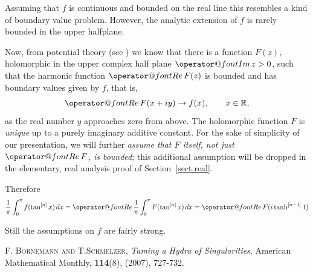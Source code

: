 \documentclass{amsart}
\makeatletter
\theoremstyle{plain}
\numberwithin{equation}{section}
\newcommand{\R}{{\mathbb  R}}
\renewcommand{\Re}{{\operator@font Re\,}}
\renewcommand{\Im}{{\operator@font Im\,}}
\makeatother
\begin{document}
Assuming that $f$ is continuous and bounded on the real line this resembles a kind of boundary value problem. However, the analytic extension of $f$ is rarely bounded in the upper halfplane.

Now, from potential theory (see \cite[Thms. 15.1a, 15.4d]{Hen}) we know that there is a function $F(z)$, holomorphic
in the upper complex half plane $\Im z >0$, such that the harmonic function $\Re F(z)$ is bounded and has boundary values given by $f$, that is,
\begin{equation}\label{eq.F}
\Re F(x+ i y) \to f(x), \qquad x\in\R,
\end{equation}
as the real number $y$ approaches zero from above. The holomorphic function $F$ is \emph{unique}
up to a purely imaginary additive constant. For the sake of simplicity of our presentation, we will further
{\em assume that $F$ itself, not just $\Re F$, is bounded}\/; this additional assumption will be dropped
in the elementary, real analysis proof of Section~\ref{sect.real}.

Therefore
\[
\frac{1}{\pi}\int_0^\pi f(\tan^{[n]}x)\,dx = \Re \frac{1}{\pi} \int_0^\pi F(\tan^{[n]}x)\,dx = \Re F(i \tanh^{[n-1]}1)
\]

Still the assumptions on $f$ are fairly strong. 

\begin{thebibliography}{9}                                                                                                %
\textsc{F. Bornemann and T.Schmelzer}, \textit{Taming a Hydra of Singularities},
American Mathematical Monthly, \textbf{114}(8), (2007), 727-732.
\end{thebibliography}
\end{document}
